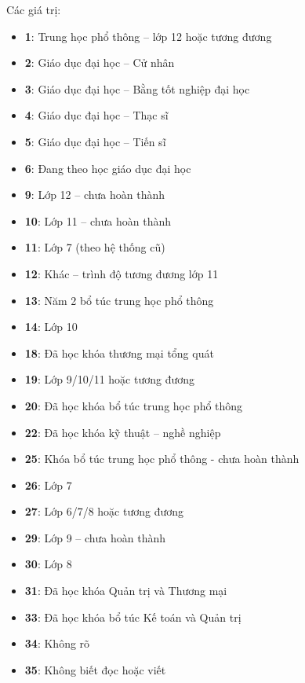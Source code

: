 \begin{itemize}
\begin{enumerate}
            Các giá trị: 
            \begin{itemize}
              \item \textbf{1}: Trung học phổ thông – lớp 12 hoặc tương đương
              \item \textbf{2}: Giáo dục đại học – Cử nhân
              \item \textbf{3}: Giáo dục đại học – Bằng tốt nghiệp đại học
              \item \textbf{4}: Giáo dục đại học – Thạc sĩ
              \item \textbf{5}: Giáo dục đại học – Tiến sĩ
              \item \textbf{6}: Đang theo học giáo dục đại học
              \item \textbf{9}: Lớp 12 – chưa hoàn thành
              \item \textbf{10}: Lớp 11 – chưa hoàn thành
              \item \textbf{11}: Lớp 7 (theo hệ thống cũ)
              \item \textbf{12}: Khác – trình độ tương đương lớp 11
              \item \textbf{13}: Năm 2 bổ túc trung học phổ thông
              \item \textbf{14}: Lớp 10
              \item \textbf{18}: Đã học khóa thương mại tổng quát
              \item \textbf{19}: Lớp 9/10/11 hoặc tương đương
              \item \textbf{20}: Đã học khóa bổ túc trung học phổ thông
              \item \textbf{22}: Đã học khóa kỹ thuật – nghề nghiệp
              \item \textbf{25}: Khóa bổ túc trung học phổ thông - chưa hoàn thành
              \item \textbf{26}: Lớp 7
              \item \textbf{27}: Lớp 6/7/8 hoặc tương đương
              \item \textbf{29}: Lớp 9 – chưa hoàn thành
              \item \textbf{30}: Lớp 8
              \item \textbf{31}: Đã học khóa Quản trị và Thương mại
              \item \textbf{33}: Đã học khóa bổ túc Kế toán và Quản trị
              \item \textbf{34}: Không rõ
              \item \textbf{35}: Không biết đọc hoặc viết

\end{itemize}
\end{enumerate}
\end{itemize}
